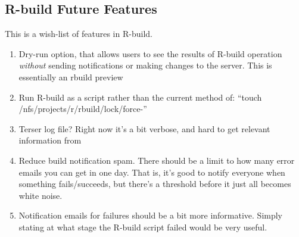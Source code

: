 \documentclass{article}
\begin{document}
\subsection{R-build Future Features}

This is a wish-list of features in R-build.

\begin{enumerate}
\item
  Dry-run option, that allows users to see the results of R-build
  operation \emph{without} sending notifications or making changes to
  the server. This is essentially an rbuild preview
\item
  Run R-build as a script rather than the current method of: ``touch
  /nfs/projects/r/rbuild/lock/force-''
\item
  Terser log file? Right now it's a bit verbose, and hard to get
  relevant information from
\item
  Reduce build notification spam. There should be a limit to how many
  error emails you can get in one day. That is, it's good to notify
  everyone when something fails/succeeds, but there's a threshold before
  it just all becomes white noise.
\item
  Notification emails for failures should be a bit more informative.
  Simply stating at what stage the R-build script failed would be very
  useful.
\end{enumerate}
\end{document}
